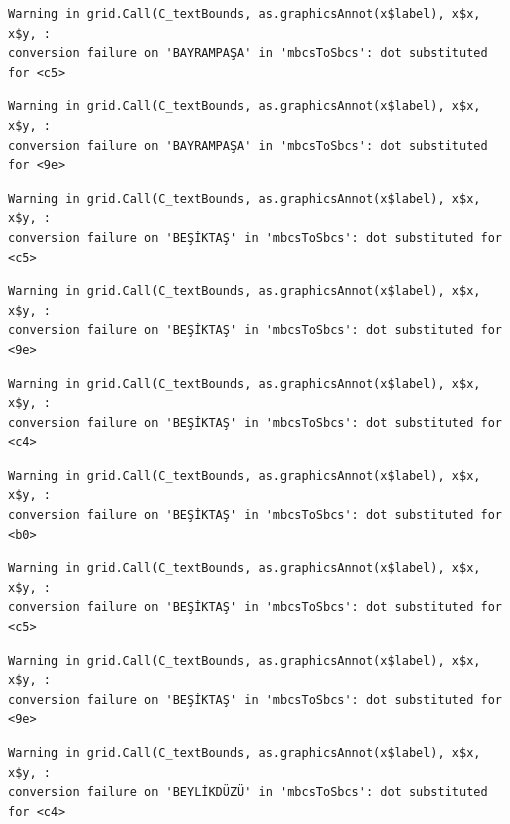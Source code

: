\documentclass[
  11pt,
  a4paper,
  DIV=11,
  numbers=noendperiod]{scrartcl}
\begin{document}
\begin{verbatim}
Warning in grid.Call(C_textBounds, as.graphicsAnnot(x$label), x$x, x$y, :
conversion failure on 'BAYRAMPAŞA' in 'mbcsToSbcs': dot substituted for <c5>
\end{verbatim}

\begin{verbatim}
Warning in grid.Call(C_textBounds, as.graphicsAnnot(x$label), x$x, x$y, :
conversion failure on 'BAYRAMPAŞA' in 'mbcsToSbcs': dot substituted for <9e>
\end{verbatim}

\begin{verbatim}
Warning in grid.Call(C_textBounds, as.graphicsAnnot(x$label), x$x, x$y, :
conversion failure on 'BEŞİKTAŞ' in 'mbcsToSbcs': dot substituted for <c5>
\end{verbatim}

\begin{verbatim}
Warning in grid.Call(C_textBounds, as.graphicsAnnot(x$label), x$x, x$y, :
conversion failure on 'BEŞİKTAŞ' in 'mbcsToSbcs': dot substituted for <9e>
\end{verbatim}

\begin{verbatim}
Warning in grid.Call(C_textBounds, as.graphicsAnnot(x$label), x$x, x$y, :
conversion failure on 'BEŞİKTAŞ' in 'mbcsToSbcs': dot substituted for <c4>
\end{verbatim}

\begin{verbatim}
Warning in grid.Call(C_textBounds, as.graphicsAnnot(x$label), x$x, x$y, :
conversion failure on 'BEŞİKTAŞ' in 'mbcsToSbcs': dot substituted for <b0>
\end{verbatim}

\begin{verbatim}
Warning in grid.Call(C_textBounds, as.graphicsAnnot(x$label), x$x, x$y, :
conversion failure on 'BEŞİKTAŞ' in 'mbcsToSbcs': dot substituted for <c5>
\end{verbatim}

\begin{verbatim}
Warning in grid.Call(C_textBounds, as.graphicsAnnot(x$label), x$x, x$y, :
conversion failure on 'BEŞİKTAŞ' in 'mbcsToSbcs': dot substituted for <9e>
\end{verbatim}

\begin{verbatim}
Warning in grid.Call(C_textBounds, as.graphicsAnnot(x$label), x$x, x$y, :
conversion failure on 'BEYLİKDÜZÜ' in 'mbcsToSbcs': dot substituted for <c4>
\end{verbatim}
\end{document}
